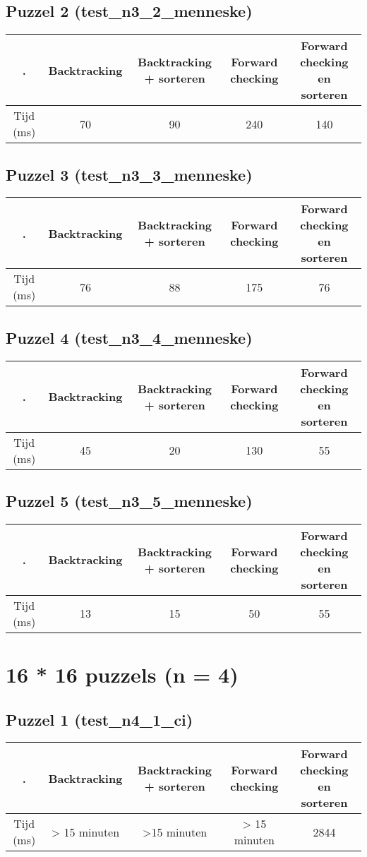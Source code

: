 \documentclass[]{report}
\begin{document}
\begin{appendices}
\subsection{Puzzel 2 (test\_n3\_2\_menneske)}
\begin{tabular}{|c||c|c|c|c|}
\hline . & Backtracking & Backtracking + sorteren & Forward checking & Forward checking en sorteren \\ 
\hline \hline Tijd (ms) & 70 & 90 & 240 & 140 \\ 
\hline 
\end{tabular}
\subsection{Puzzel 3 (test\_n3\_3\_menneske)}
\begin{tabular}{|c||c|c|c|c|}
\hline . & Backtracking & Backtracking + sorteren & Forward checking & Forward checking en sorteren \\ 
\hline \hline Tijd (ms) & 76 & 88 & 175 & 76 \\ 
\hline 
\end{tabular}
\subsection{Puzzel 4 (test\_n3\_4\_menneske)}
\begin{tabular}{|c||c|c|c|c|}
\hline . & Backtracking & Backtracking + sorteren & Forward checking & Forward checking en sorteren \\ 
\hline \hline Tijd (ms) & 45 & 20 & 130 & 55 \\ 
\hline 
\end{tabular}
\subsection{Puzzel 5 (test\_n3\_5\_menneske)}
\begin{tabular}{|c||c|c|c|c|}
\hline . & Backtracking & Backtracking + sorteren & Forward checking & Forward checking en sorteren \\ 
\hline \hline Tijd (ms) & 13 & 15 & 50 & 55 \\ 
\hline 
\end{tabular}
\section{16 * 16 puzzels (n = 4)}
\subsection{Puzzel 1 (test\_n4\_1\_ci)}
\begin{tabular}{|c||c|c|c|c|}
\hline . & Backtracking & Backtracking + sorteren & Forward checking & Forward checking en sorteren \\ 
\hline \hline Tijd (ms) & > 15 minuten & >15 minuten & > 15 minuten & 2844 \\ 
\hline 
\end{tabular}

\end{appendices}
\end{document}
